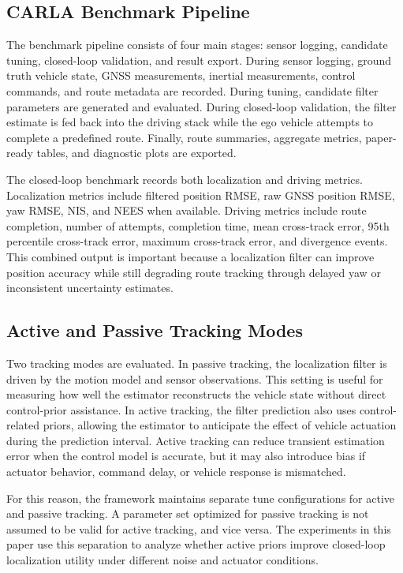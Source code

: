 \documentclass[conference]{IEEEtran}
\begin{document}
\subsection{CARLA Benchmark Pipeline}

The benchmark pipeline consists of four main stages: sensor logging, candidate tuning, closed-loop validation, and result export. During sensor logging, ground truth vehicle state, GNSS measurements, inertial measurements, control commands, and route metadata are recorded. During tuning, candidate filter parameters are generated and evaluated. During closed-loop validation, the filter estimate is fed back into the driving stack while the ego vehicle attempts to complete a predefined route. Finally, route summaries, aggregate metrics, paper-ready tables, and diagnostic plots are exported.

The closed-loop benchmark records both localization and driving metrics. Localization metrics include filtered position RMSE, raw GNSS position RMSE, yaw RMSE, NIS, and NEES when available. Driving metrics include route completion, number of attempts, completion time, mean cross-track error, 95th percentile cross-track error, maximum cross-track error, and divergence events. This combined output is important because a localization filter can improve position accuracy while still degrading route tracking through delayed yaw or inconsistent uncertainty estimates.

\subsection{Active and Passive Tracking Modes}

Two tracking modes are evaluated. In passive tracking, the localization filter is driven by the motion model and sensor observations. This setting is useful for measuring how well the estimator reconstructs the vehicle state without direct control-prior assistance. In active tracking, the filter prediction also uses control-related priors, allowing the estimator to anticipate the effect of vehicle actuation during the prediction interval. Active tracking can reduce transient estimation error when the control model is accurate, but it may also introduce bias if actuator behavior, command delay, or vehicle response is mismatched.

For this reason, the framework maintains separate tune configurations for active and passive tracking. A parameter set optimized for passive tracking is not assumed to be valid for active tracking, and vice versa. The experiments in this paper use this separation to analyze whether active priors improve closed-loop localization utility under different noise and actuator conditions.
\end{document}
